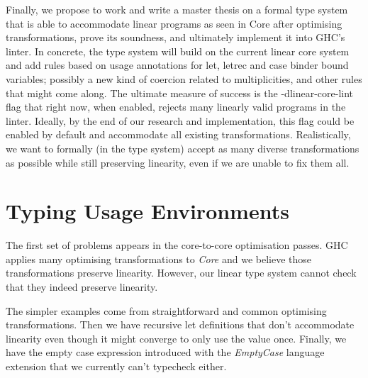 \documentclass[a4paper, draft]{article}
\begin{document}

Finally, we propose to work and write a master thesis on a formal type system
that is able to accommodate linear programs as seen in Core after optimising
transformations, prove its soundness, and ultimately implement it into GHC's
linter. In concrete, the type system will build on the current linear core
system and add rules based on usage annotations for let, letrec and case
binder bound variables; possibly a new kind of coercion related to
multiplicities, and other rules that might come along.
%
The ultimate measure of success is the -dlinear-core-lint flag that right now,
when enabled, rejects many linearly valid programs in the linter. Ideally, by
the end of our research and implementation, this flag could be enabled by
default and accommodate all existing transformations. Realistically, we want to
formally (in the type system) accept as many diverse transformations as possible
while still preserving linearity, even if we are unable to fix them all.




\section{Typing Usage Environments}

The first set of problems appears in the core-to-core optimisation passes. GHC
applies many optimising transformations to \emph{Core} and we believe those
transformations preserve linearity. However, our linear type system cannot check
that they indeed preserve linearity.

The simpler examples come from straightforward and common optimising
transformations. Then we have recursive let definitions that don't accommodate
linearity even though it might converge to only use the value once. Finally, we
have the empty case expression introduced with the \emph{EmptyCase} language
extension that we currently can't typecheck either.
\end{document}
